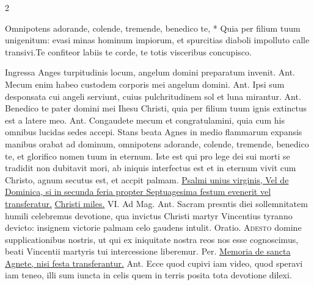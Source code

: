 \begin{multicols*}{2}
\begin{responsory}
\end{responsory}%
\begin{responsory-doxology}
{Omnipotens adorande, colende, tremende, benedico te, * Quia per filium tuum unigenitum: evasi minas hominum impiorum, et spurcitias diaboli impolluto calle transivi.}{Te confiteor labiis te corde, te totis visceribus concupisco.}
\end{responsory-doxology}%
 Ingressa Anges turpitudinis locum, angelum domini preparatum invenit. {\color{Red} Ant.} Mecum enim habeo custodem corporis mei angelum domini. {\color{Red} Ant.} Ipsi sum desponsata cui angeli serviunt, cuius pulchritudinem sol et luna mirantur. {\color{Red} Ant.} Benedico te pater domini mei Ihesu Christi, quia per filium tuum ignis extinctus est a latere meo. {\color{Red} Ant.} Congaudete mecum et congratulamini, quia cum his omnibus lucidas sedes accepi.
 Stans beata Agnes in medio flammarum expansis manibus orabat ad dominum, omnipotens adorande, colende, tremende, benedico te, et glorifico nomen tuum in eternum.
{\color{Red} }
 Iste est qui pro lege dei sui morti se tradidit non dubitavit mori, ab iniquis interfectus est et in eternum vivit cum Christo, agnum secutus est, et accpit palmam.
\newline \ul{Psalmi unius virginis, Vel de Dominica, si in secunda feria propter Septuagesima festum evenerit vel transferatur.}
\newline \R \hyperlink{christi-miles-preciosus}{Christi miles.} {\color{Red} VI. Ad Mag. Ant.} Sacram presntis diei sollemnitatem humili celebremus devotione, qua invictus Christi martyr Vincentius tyranno devicto: insignem victorie palmam celo gaudens intulit. {\color{Red} Oratio.}
\lettrine[lines=2]{\zallmancaps \color{Red} A}{desto} domine supplicationibus nostris, ut qui ex iniquitate nostra reos nos esse cognoscimus, beati Vincentii martyris tui intercessione liberemur. Per.
\newline \ul{Memoria de sancta Agnete, nisi festa transferantur.} {\color{Red} Ant.} Ecce quod cupivi iam video, quod speravi iam teneo, illi sum iuncta in celis quem in terris posita tota devotione dilexi.

\end{multicols*}
